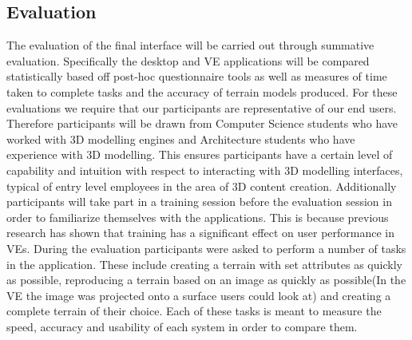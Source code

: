 \documentclass{article}
\begin{document}
\subsection{Evaluation}

The evaluation of the final interface will be carried out through summative evaluation\cite{Bowman2002}. Specifically the desktop and VE applications will be compared statistically based off post-hoc questionnaire tools as well as measures of time taken to complete tasks and the accuracy of terrain models produced.
\newline\newline
For these evaluations we require that our participants are representative of our end users\cite{Bowman2002}. Therefore participants will be drawn from Computer Science students who have worked with 3D modelling engines and Architecture students who have experience with 3D modelling. This ensures participants have a certain level of capability and intuition with respect to interacting with 3D modelling interfaces, typical of entry level employees in the area of 3D content creation. Additionally participants will take part in a training session before the evaluation session in order to familiarize themselves with the applications.  This is because previous research has shown that training has a significant effect on user performance in VEs\cite{Schultheis2012}.
\newline\newline
During the evaluation participants were asked to perform a number of tasks in the application. These include creating a terrain with set attributes as quickly as possible, reproducing a terrain based on an image as quickly as possible(In the VE the image was projected onto a surface users could look at) and creating a complete terrain of their choice. Each of these tasks is meant to measure the speed, accuracy and usability of each system in order to compare them.


\end{document}
